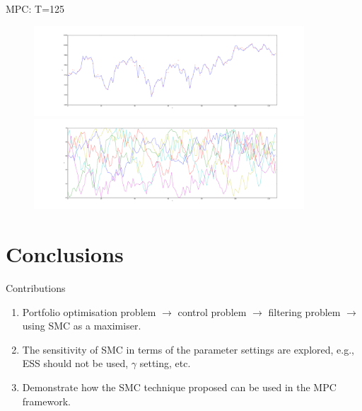 \documentclass[handout]{beamer}
\begin{document}
\begin{frame}{MPC: T=125}
   \begin{figure}
    \centering
    \includegraphics[width = 0.9\textwidth, height=0.4\textheight]{figures/DAXMPC-y-2-long.pdf}\\
    \includegraphics[width = 0.9\textwidth, height=0.4\textheight]{figures/DAXMPC-u-2-long.pdf}
  \end{figure}
\end{frame}

\section{Conclusions}
\begin{frame}{Contributions}
\begin{enumerate}
\item Portfolio optimisation problem $\rightarrow$ control problem $\rightarrow$ filtering problem $\rightarrow$ using SMC as a maximiser.
\item The sensitivity of SMC in terms of the parameter settings are explored, e.g., ESS should not be used, $\gamma$ setting, etc.
\item Demonstrate how the SMC technique proposed can be used in the MPC framework.
\end{enumerate}
\end{frame}
\end{document}
